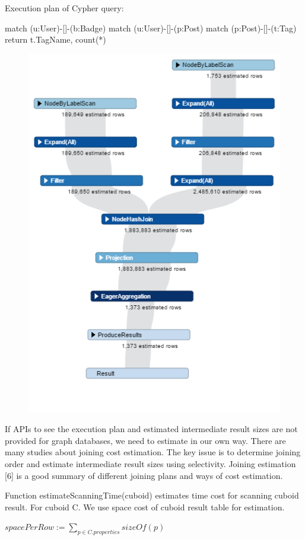 Execution plan of Cypher query:

match (u:User)-[]-(b:Badge)  match (u:User)-[]-(p:Post)  match (p:Post)-[]-(t:Tag)  return  t.TagName, count(*)

\begin {figure}[H]
\centering
\includegraphics[scale=0.6]{pic/61.png}
\end{figure}

If APIs to see the execution plan and estimated intermediate result sizes are not provided for graph databases, we need to estimate in our own way. There are many studies about joining cost estimation. The key issue is to determine joining order and estimate intermediate result sizes using selectivity. Joining estimation [6] is a good summary of different joining plans and ways of cost estimation. 

Function estimateScanningTime(cuboid) estimates time cost for scanning cuboid result. For cuboid C. We use space cost of cuboid result table for estimation. 

 $spacePerRow:= 
 \displaystyle{\sum_{p\in C.properties}sizeOf(p)}$
 
